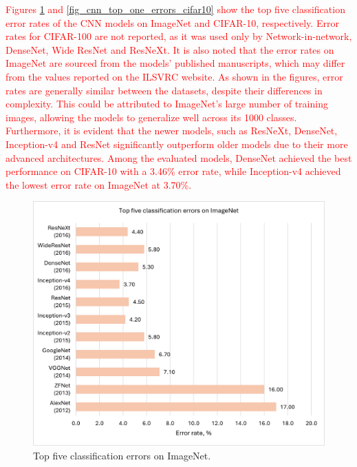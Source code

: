 \documentclass[preprint,12pt]{elsarticle}
\begin{document}
\textcolor{red}{Figures \ref{fig_cnn_top_five_errors_imagenet} and \ref{fig_cnn_top_one_errors_cifar10} show the top five classification error rates of the CNN models on ImageNet and CIFAR-10, respectively. Error rates for CIFAR-100 are not reported, as it was used only by Network-in-network, DenseNet, Wide ResNet and ResNeXt. It is also noted that the error rates on ImageNet are sourced from the models' published manuscripts, which may differ from the values reported on the ILSVRC website. As shown in the figures, error rates are generally similar between the datasets, despite their differences in complexity. This could be attributed to ImageNet's large number of training images, allowing the models to generalize well across its 1000 classes. Furthermore, it is evident that the newer models, such as ResNeXt, DenseNet, Inception-v4 and ResNet significantly outperform older models due to their more advanced architectures. Among the evaluated models, DenseNet achieved the best performance on CIFAR-10 with a 3.46\% error rate, while Inception-v4 achieved the lowest error rate on ImageNet at 3.70\%.}

\begin{figure}[h!]
    \centering
    \includegraphics[scale=0.8]{fig_cnn_top_five_errors_imagenet.png}
    \caption{Top five classification errors on ImageNet.}
    \label{fig_cnn_top_five_errors_imagenet}
\end{figure}
\end{document}
